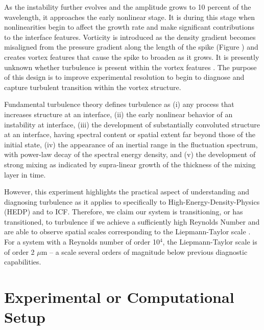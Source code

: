 As the instability further evolves and the amplitude grows to 10 percent of the wavelength, it approaches the early nonlinear stage. It is during this stage when nonlinearities begin to affect the growth rate and make significant contributions to the interface features.\cite{Zhou:2017, robey2003onset}  Vorticity is introduced as the density gradient becomes misaligned from the pressure gradient along the length of the spike (Figure ) and creates vortex features that cause the spike to broaden as it grows. It is presently unknown whether turbulence is present within the vortex features \cite{jacobs1996experimental}.  The purpose of this design is to improve experimental resolution to begin to diagnose and capture turbulent transition within the vortex structure. 

  Fundamental turbulence theory defines turbulence as (i) any process that increases structure at an interface, (ii) the early nonlinear behavior of an instability at interface, (iii) the development of substantially convoluted structure at an interface, having spectral content or spatial extent far beyond those of the initial state, (iv) the appearance of an inertial range in the fluctuation spectrum, with power-law decay of the spectral energy density, and (v) the development of strong mixing as indicated by supra-linear growth of the thickness of the mixing layer in time. \cite{RPD}




However, this experiment highlights the practical aspect of understanding and diagnosing turbulence as it applies to specifically to High-Energy-Density-Physics (HEDP) and to ICF. Therefore, we claim our system is transitioning, or has transitioned, to turbulence if we achieve a sufficiently high Reynolds Number \cite{zhou2019turbulent, zhou2003progress, zhou2007unification} and are able to observe spatial scales corresponding to the Liepmann-Taylor scale \cite{RPD, dimotakis2000mixing, dimonte2006k,Robey:2003, Zhou:2017, zhou2019turbulent}.  For a system with a Reynolds number of order 10$^4$, the Liepmann-Taylor scale is of order 2 $\mu$m -- a scale several orders of magnitude below previous diagnostic capabilities.





\section{Experimental or Computational Setup}


